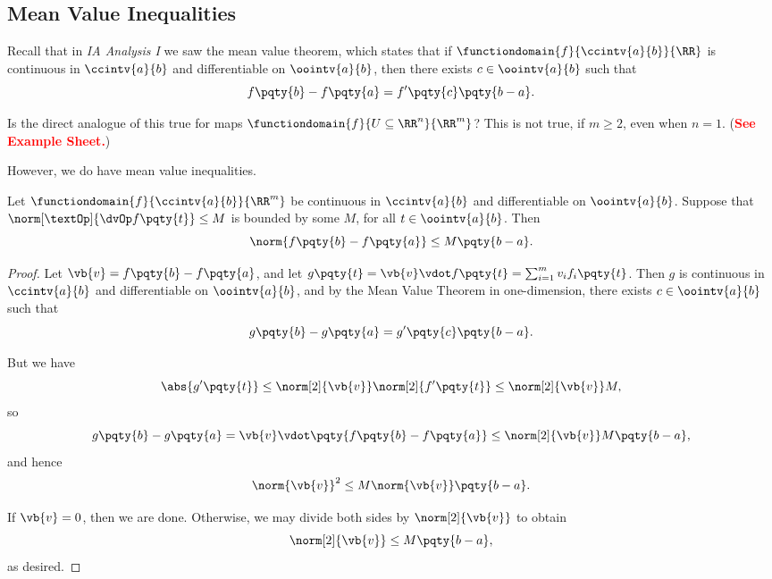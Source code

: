 \subsection{Mean Value Inequalities}

Recall that in \textit{IA Analysis I} we saw the mean value theorem, which states that if \(\functiondomain{f}{\ccintv{a}{b}}{\RR}\) is continuous in \(\ccintv{a}{b}\) and differentiable on \(\oointv{a}{b}\), then there exists \(c \in \oointv{a}{b}\) such that
\[
    f\pqty{b} - f\pqty{a} = f'\pqty{c} \pqty{b - a}.
\]

Is the direct analogue of this true for maps \(\functiondomain{f}{U \subseteq \RR^n}{\RR^m}\)? This is not true, if \(m \geq 2\), even when \(n = 1\). (\textbf{\textcolor{red}{See Example Sheet.}})

However, we do have mean value inequalities.

\begin{theorem}[Mean Value Inequality for \(n = 1\)]
    \label{thm:mean-value-inequality-n-1}%
    Let \(\functiondomain{f}{\ccintv{a}{b}}{\RR^m}\) be continuous in \(\ccintv{a}{b}\) and differentiable on \(\oointv{a}{b}\). Suppose that \(\norm[\textOp]{\dvOp f\pqty{t}} \leq M\) is bounded by some \(M\), for all \(t \in \oointv{a}{b}\). Then
    \[
        \norm{f\pqty{b} - f\pqty{a}} \leq M \pqty{b - a}.
    \]
\end{theorem}

\begin{proof}
    Let \(\vb{v} = f\pqty{b} - f\pqty{a}\), and let \(g\pqty{t} = \vb{v} \vdot f\pqty{t} = \sum_{i = 1}^{m} v_i f_i\pqty{t}\). Then \(g\) is continuous in \(\ccintv{a}{b}\) and differentiable on \(\oointv{a}{b}\), and by the Mean Value Theorem in one-dimension, there exists \(c \in \oointv{a}{b}\) such that
    \[
        g\pqty{b} - g\pqty{a} = g'\pqty{c} \pqty{b - a}.
    \]

    But we have
    \[
        \abs{g'\pqty{t}} \leq \norm[2]{\vb{v}} \norm[2]{f'\pqty{t}} \leq \norm[2]{\vb{v}} M,
    \]
    so
    \[
        g\pqty{b} - g\pqty{a} = \vb{v} \vdot \pqty{f\pqty{b} - f\pqty{a}} \leq \norm[2]{\vb{v}} M \pqty{b - a},
    \]
    and hence
    \[
        \norm{\vb{v}}^2 \leq M \norm{\vb{v}} \pqty{b - a}.
    \]

    If \(\vb{v} = 0\), then we are done. Otherwise, we may divide both sides by \(\norm[2]{\vb{v}}\) to obtain
    \[
        \norm[2]{\vb{v}} \leq M \pqty{b - a},
    \]
    as desired.
\end{proof}

